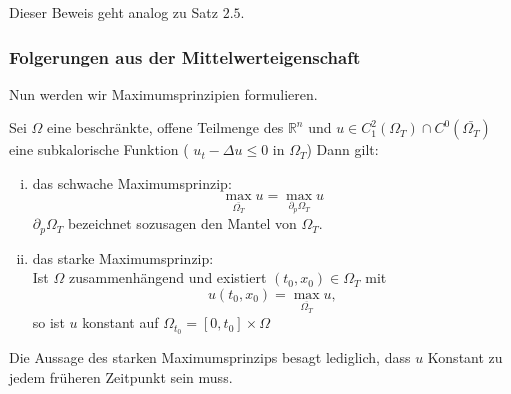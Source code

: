 \begin{beweis}
	Dieser Beweis geht analog zu Satz $2.5$.
\end{beweis}

\subsubsection{Folgerungen aus der Mittelwerteigenschaft} 
\label{sub:folgerungen_aus_der_mittelwerteigenschaft}
Nun werden wir Maximumsprinzipien formulieren.

\begin{satz}[Maximumsprinzipien]
	Sei $\Omega$ eine beschränkte, offene Teilmenge des $\mathbb{R}^n$ und $ u \in C^2_1(\Omega_T) \cap C^0( \bar{\Omega_T})$ eine subkalorische Funktion
	( $ u_t - \Delta u \leq 0$ in $\Omega_T$) Dann gilt:
	\begin{enumerate}[(i)]
		\item das schwache Maximumsprinzip:
		\[
			\max_{\bar{\Omega_T}} u = \max_{\partial_p \Omega_T} u
		\]
		$\partial_p \Omega_T$ bezeichnet sozusagen den Mantel von $\Omega_T$.
		\item das starke Maximumsprinzip: \\
		Ist $\Omega$ zusammenhängend und existiert $(t_0,x_0) \in \Omega_T$ mit 
		\[
			u(t_0,x_0) = \max_{\overline{\Omega_T}}u,
		\]
		so ist $u$ konstant auf $\Omega_{t_0}= [0,t_0] \times \Omega$
	\end{enumerate}
\end{satz}
\begin{bemerkung}
	Die Aussage des starken Maximumsprinzips besagt lediglich, dass $u$ Konstant zu jedem früheren Zeitpunkt sein muss.
\end{bemerkung}

